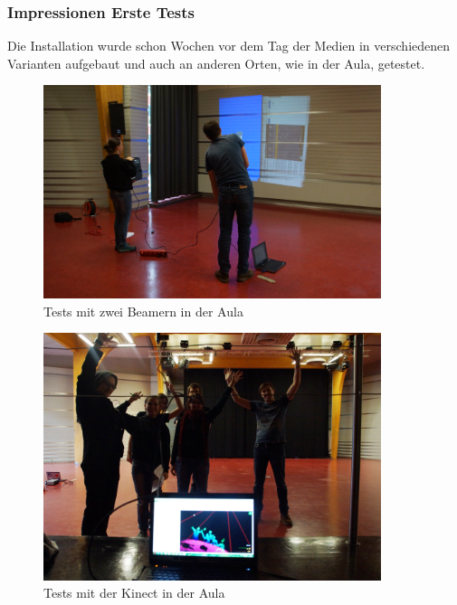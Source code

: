 \subsubsection{Impressionen Erste Tests}
Die Installation wurde schon Wochen vor dem Tag der Medien in verschiedenen Varianten aufgebaut und auch an anderen Orten, wie in der Aula, getestet.

\begin{figure}[htbp]
	\centering
		\includegraphics[width=0.88\textwidth]{images/Test1.png}
	\caption{Tests mit zwei Beamern in der Aula}
	\label{fig:Test1}
\end{figure}

\begin{figure}[htbp]
	\centering
		\includegraphics[width=0.88\textwidth]{images/Test2.png}
	\caption{Tests mit der Kinect in der Aula}
	\label{fig:Test2}
\end{figure}


